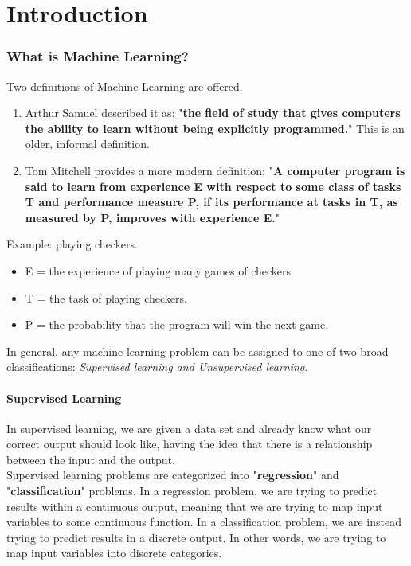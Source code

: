 \chapter{Introduction}\label{chapt:sum}

\subsection*{What is Machine Learning?}

Two definitions of Machine Learning are offered. 

\begin{enumerate}
\item Arthur Samuel described it as: "\textbf{the field of study that gives computers the ability to learn without being explicitly programmed.}" This is an older, informal definition.

\item Tom Mitchell provides a more modern definition: "\textbf{A computer program is said to learn from experience E with respect to some class of tasks T and performance measure P, if its performance at tasks in T, as measured by P, improves with experience E.}"
\end{enumerate}

Example: playing checkers.

\begin{itemize}
\item E = the experience of playing many games of checkers
\item T = the task of playing checkers.
\item P = the probability that the program will win the next game.
\end{itemize}

In general, any machine learning problem can be assigned to one of two broad classifications: \textit{Supervised learning and Unsupervised learning}.

\subsubsection*{Supervised Learning}

In supervised learning, we are given a data set and already know what our correct output should look like, having the idea that there is a relationship between the input and the output.\\

Supervised learning problems are categorized into "\textbf{regression}" and "\textbf{classification}" problems. In a regression problem, we are trying to predict results within a continuous output, meaning that we are trying to map input variables to some continuous function. In a classification problem, we are instead trying to predict results in a discrete output. In other words, we are trying to map input variables into discrete categories.\\

